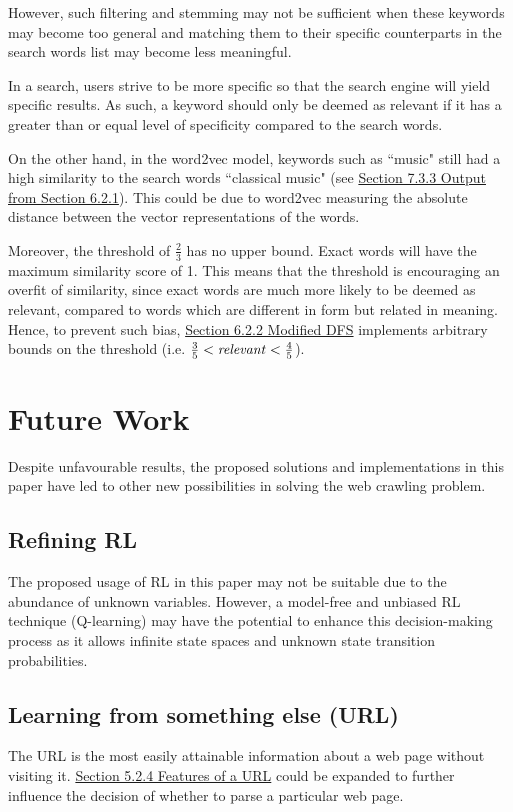 \documentclass{article}
\begin{document}
However, such filtering and stemming may not be sufficient when these keywords may become too general and matching them to their specific counterparts in the search words list may become less meaningful.
\medskip

In a search, users strive to be more specific so that the search engine will yield specific results. As such, a keyword should only be deemed as relevant if it has a greater than or equal level of specificity compared to the search words.
\medskip

On the other hand, in the word2vec model, keywords such as ``music" still had a high similarity to the search words ``classical music" (see \hyperref[sec:7.3.3]{Section 7.3.3 Output from Section 6.2.1}). This could be due to word2vec measuring the absolute distance between the vector representations of the words.
\medskip

Moreover, the threshold of $ \frac{2}{3} $ has no upper bound. Exact words will have the maximum similarity score of 1. This means that the threshold is encouraging an overfit of similarity, since exact words are much more likely to be deemed as relevant, compared to words which are different in form but related in meaning. Hence, to prevent such bias, \hyperref[sec:6.2.2]{Section 6.2.2 Modified DFS} implements arbitrary bounds on the threshold (i.e. $ \frac{3}{5} < \text{\textit{relevant}} <\frac{4}{5} $).
\newpage

\section{Future Work}
Despite unfavourable results, the proposed solutions and implementations in this paper have led to other new possibilities in solving the web crawling problem.

\subsection{Refining RL}
The proposed usage of RL in this paper may not be suitable due to the abundance of unknown variables. However, a model-free and unbiased RL technique (Q-learning) may have the potential to enhance this decision-making process as it allows infinite state spaces and unknown state transition probabilities.

\subsection{Learning from something else (URL)}
The URL is the most easily attainable information about a web page without visiting it. \hyperref[sec:5.2.4]{Section 5.2.4 Features of a URL} could be expanded to further influence the decision of whether to parse a particular web page.
\medskip
\end{document}

